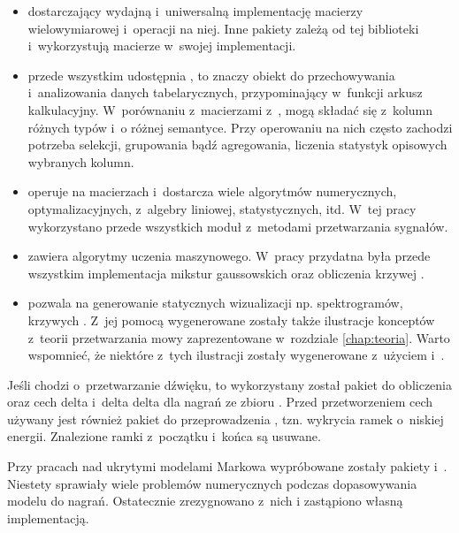 \begin{itemize}
    \item {} dostarczający wydajną i~uniwersalną implementację macierzy wielowymiarowej i~operacji na niej.
        Inne pakiety zależą od tej biblioteki i~wykorzystują macierze w~swojej implementacji.
    \item {} przede wszystkim udostępnia , to znaczy obiekt do przechowywania i~analizowania danych tabelarycznych, przypominający w~funkcji arkusz kalkulacyjny. W~porównaniu z~macierzami z~,  mogą składać się z~kolumn różnych typów i~o różnej semantyce. Przy operowaniu na nich często zachodzi potrzeba selekcji, grupowania bądź agregowania, liczenia statystyk opisowych wybranych kolumn.
    \item {} operuje na macierzach  i~dostarcza wiele algorytmów numerycznych, optymalizacyjnych, z~algebry liniowej, statystycznych, itd. W~tej pracy wykorzystano przede wszystkich moduł z~metodami przetwarzania sygnałów.
    \item {} zawiera algorytmy uczenia maszynowego. W~pracy przydatna była przede wszystkim implementacja mikstur gaussowskich oraz obliczenia krzywej .
    \item {} pozwala na generowanie statycznych wizualizacji np. spektrogramów, krzywych . Z~jej pomocą wygenerowane zostały także ilustracje konceptów z~teorii przetwarzania mowy zaprezentowane w~rozdziale \ref{chap:teoria}. Warto wspomnieć, że niektóre z~tych ilustracji zostały wygenerowane z~użyciem  i~.
\end{itemize}

Jeśli chodzi o~przetwarzanie dźwięku, to wykorzystany został pakiet 
do obliczenia  oraz cech delta i~delta delta dla nagrań ze zbioru .
Przed przetworzeniem cech używany jest również pakiet  do przeprowadzenia
, tzn. wykrycia ramek o~niskiej energii. Znalezione ramki z~początku i~końca są usuwane.

Przy pracach nad ukrytymi modelami Markowa wypróbowane zostały pakiety  i~.
Niestety sprawiały wiele problemów numerycznych podczas dopasowywania modelu do nagrań. Ostatecznie zrezygnowano z~nich
i zastąpiono własną implementacją.

